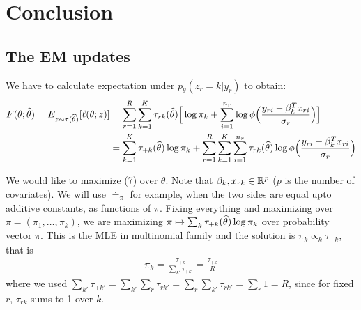 \documentclass[12pt]{article}
\begin{document}
\section{Conclusion}
\label{sec:conc}
\cleardoublepage
\begin{appendices}
\section{The EM updates}\label{sec:EM:details}
We have to calculate expectation under $p_\theta(z_r = k|y_r)$ to obtain:
\begin{align*}
	F(\theta;\widehat\theta) = E_{z \sim \tau(\widehat\theta)} [\ell(\theta;z)] &=   \sum_{r=1}^R \sum_{k=1}^K \tau_{rk}(\widehat\theta) \Big[\log \pi_k + \sum_{i=1}^{n_r} \log \phi\Big( \frac{y_{ri} - \beta_k^T x_{ri}}{\sigma_r} \Big) \Big]\\
	&=\sum_{k=1}^K \tau_{+k}(\widehat\theta) \log \pi_k + 
	\sum_{r=1}^R \sum_{k=1}^K \sum_{i=1}^{n_r}  \tau_{rk}(\widehat\theta) \log \phi\Big( \frac{y_{ri} - \beta_k^T x_{ri}}{\sigma_r} \Big)
\end{align*}


We would like to maximize (7) over $\theta$. Note that $\beta_k,x_{rk} \in \mathbb{R}^p$ ($p$ is the number of covariates).
We will use $\doteq_\pi$ for example, when the two sides are equal upto additive constants, as functions of $\pi$. Fixing everything and maximizing over $\pi = (\pi_1,\dots,\pi_k)$, we are maximizing $\pi \mapsto \sum_k \tau_{+k}(\widehat\theta) \log \pi_k$ over probability vector $\pi$. This is the MLE in multinomial family and the solution is $\pi_k \propto_k \tau_{+k}$, that is
	\begin{align}\label{eq:pi:update:1}
	    \pi_k = \frac{\tau_{+k}}{\sum_{k'} \tau_{+k'}}  = \frac{\tau_{+k}}{R}
	\end{align}
	where we used $\sum_{k'} \tau_{+k'} = \sum_{k'} \sum_r \tau_{rk'} = \sum_r \sum_{k'} \tau_{rk'} = \sum_r 1 = R$, since for fixed $r$, $\tau_{rk}$ sums to 1 over $k$.
	

\end{appendices}
\end{document}
